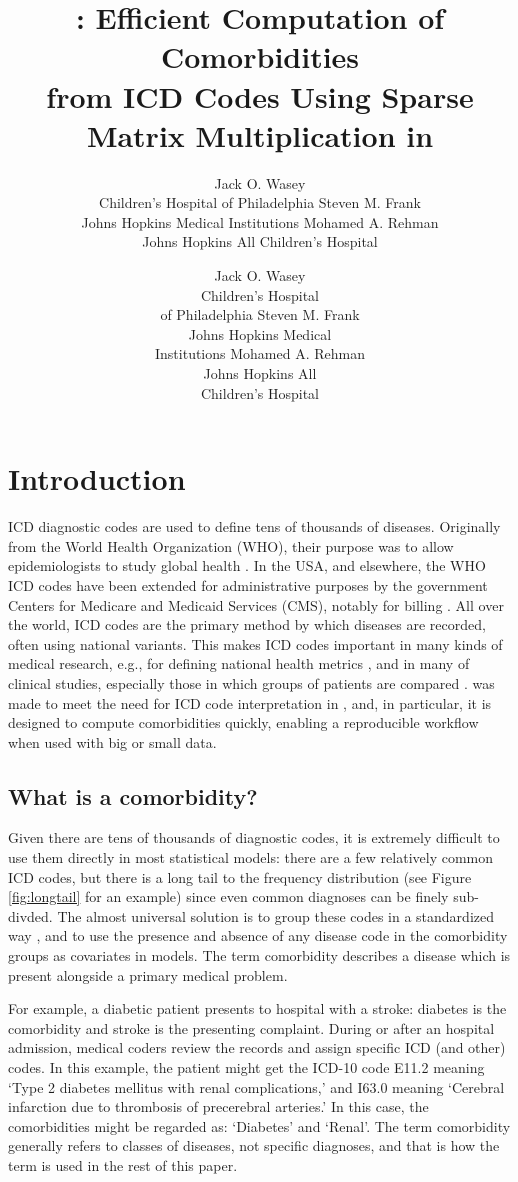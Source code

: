 \documentclass[article]{jss}
\author{
Jack O. Wasey\\Children's Hospital of Philadelphia \And Steven M. Frank\\Johns Hopkins Medical Institutions \And Mohamed A. Rehman\\Johns Hopkins All Children's Hospital
}
\title{\pkg{icd}: Efficient Computation of Comorbidities\\
from ICD Codes Using Sparse Matrix Multiplication in \proglang{R}}
\author{Jack O. Wasey\\Children's Hospital\\of Philadelphia \And Steven M. Frank\\Johns Hopkins Medical\\Institutions \And Mohamed A. Rehman\\Johns Hopkins All\\Children's Hospital}
\begin{document}
\hypertarget{introduction}{%
\section{Introduction}\label{introduction}}

ICD diagnostic codes are used to define tens of thousands of diseases.
Originally from the World Health Organization (WHO), their purpose was
to allow epidemiologists to study global health
\citep{WHO_Internationalclassificationdiseases_2018}. In the USA, and
elsewhere, the WHO ICD codes have been extended for administrative
purposes by the government Centers for Medicare and Medicaid Services
(CMS), notably for billing \citep{CMS_CentersMedicareMedicaid_2018}. All
over the world, ICD codes are the primary method by which diseases are
recorded, often using national variants. This makes ICD codes important
in many kinds of medical research, e.g., for defining national health
metrics \citep{Lee_Predictingmortalitypatients_2003}, and in many of
clinical studies, especially those in which groups of patients are
compared \citep[e.g.,][]{frank_risk-adjusted_2014}.  was made
to meet the need for ICD code interpretation in , and, in
particular, it is designed to compute comorbidities quickly, enabling a
reproducible workflow when used with big or small data.

\hypertarget{what-is-a-comorbidity}{%
\subsection{What is a comorbidity?}\label{what-is-a-comorbidity}}

Given there are tens of thousands of diagnostic codes, it is extremely
difficult to use them directly in most statistical models: there are a
few relatively common ICD codes, but there is a long tail to the
frequency distribution (see Figure \ref{fig:longtail} for an example)
since even common diagnoses can be finely sub-divded. The almost
universal solution is to group these codes in a standardized way
\citep[e.g.,][]{quan_coding_2005, elixhauser_comorbidity_1998}, and to
use the presence and absence of any disease code in the comorbidity
groups as covariates in models. The term comorbidity describes a disease
which is present alongside a primary medical problem.

For example, a diabetic patient presents to hospital with a stroke:
diabetes is the comorbidity and stroke is the presenting complaint.
During or after an hospital admission, medical coders review the records
and assign specific ICD (and other) codes. In this example, the patient
might get the ICD-10 code E11.2 meaning `Type 2 diabetes mellitus with
renal complications,' and I63.0 meaning `Cerebral infarction due to
thrombosis of precerebral arteries.' In this case, the comorbidities
might be regarded as: `Diabetes' and `Renal'. The term comorbidity
generally refers to classes of diseases, not specific diagnoses, and
that is how the term is used in the rest of this paper.
\end{document}
